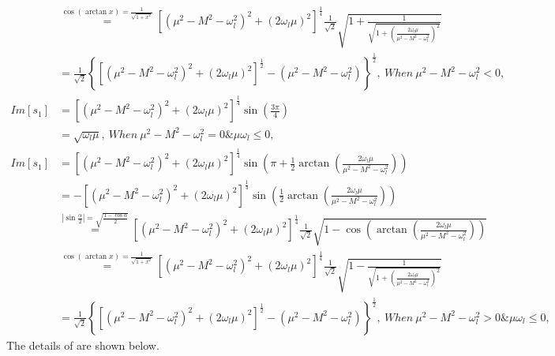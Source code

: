 \documentclass{article}
\begin{document}
\begin{equation}
\begin{split}
        \\&\stackrel{\cos\left(\arctan x\right)=\frac{1}{\sqrt{1+x^2}}}{=}
        \left[\left(\mu^2-M^2-\omega_l^2\right)^2+\left(2\omega_l\mu\right)^2\right]^{\frac{1}{4}}\frac{1}{\sqrt{2}}
        \sqrt{1+\frac{1}{\sqrt{1+\left(\frac{2\omega_l\mu}{\mu^2-M^2-\omega_l^2}\right)^2}}}
        \\&=\frac{1}{\sqrt{2}}\left\{\left[\left(\mu^2-M^2-\omega_l^2\right)^2+\left(2\omega_l\mu\right)^2\right]^{\frac{1}{2}}-\left(\mu^2-M^2-\omega_l^2\right)\right\}^{\frac{1}{2}},\ When\ \mu^2-M^2-\omega_l^2<0,\\
        Im\left[s_1\right]&=\left[\left(\mu^2-M^2-\omega_l^2\right)^2+\left(2\omega_l\mu\right)^2\right]^{\frac{1}{4}}\sin\left(\frac{3\pi}{4}\right)
        \\&=\sqrt{\omega_l\mu},\ When\ \mu^2-M^2-\omega_l^2=0\&\mu\omega_l\leq 0,\\
        Im\left[s_1\right]&=\left[\left(\mu^2-M^2-\omega_l^2\right)^2+\left(2\omega_l\mu\right)^2\right]^{\frac{1}{4}}\sin\left(\pi+\frac{1}{2}\arctan\left(\frac{2\omega_l\mu}{\mu^2-M^2-\omega_l^2}\right)\right)\\
        &=-\left[\left(\mu^2-M^2-\omega_l^2\right)^2+\left(2\omega_l\mu\right)^2\right]^{\frac{1}{4}}\sin\left(\frac{1}{2}\arctan\left(\frac{2\omega_l\mu}{\mu^2-M^2-\omega_l^2}\right)\right)
        \\&\stackrel{|\sin\frac{\alpha}{2}|=\sqrt{\frac{1-\cos\alpha}{2}}}{=}\left[\left(\mu^2-M^2-\omega_l^2\right)^2+\left(2\omega_l\mu\right)^2\right]^{\frac{1}{4}}\frac{1}{\sqrt{2}}\sqrt{1-\cos\left(\arctan\left(\frac{2\omega_l\mu}{\mu^2-M^2-\omega_l^2}\right)\right)}
        \\&\stackrel{\cos\left(\arctan x\right)=\frac{1}{\sqrt{1+x^2}}}{=}
        \left[\left(\mu^2-M^2-\omega_l^2\right)^2+\left(2\omega_l\mu\right)^2\right]^{\frac{1}{4}}\frac{1}{\sqrt{2}}
        \sqrt{1-\frac{1}{\sqrt{1+\left(\frac{2\omega_l\mu}{\mu^2-M^2-\omega_l^2}\right)^2}}}
        \\&=\frac{1}{\sqrt{2}}\left\{\left[\left(\mu^2-M^2-\omega_l^2\right)^2+\left(2\omega_l\mu\right)^2\right]^{\frac{1}{2}}-\left(\mu^2-M^2-\omega_l^2\right)\right\}^{\frac{1}{2}},\ When\ \mu^2-M^2-\omega_l^2>0\&\mu\omega_l\leq 0,
    \end{split}
\end{equation}
The details of are shown below.
\end{document}
